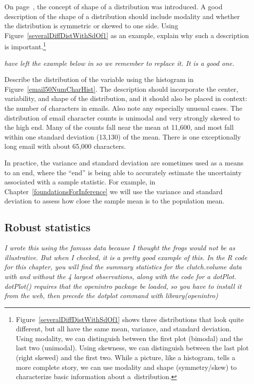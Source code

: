 \begin{doublespace}
\begin{exercise}
	On page~\pageref{shapeFirstDiscussed}, the concept of shape of a distribution was introduced. A good description of the shape of a distribution should include modality and whether the distribution is symmetric or skewed to one side. Using Figure~\ref{severalDiffDistWithSdOf1} as an example, explain why such a description is important.\footnote{Figure~\ref{severalDiffDistWithSdOf1} shows three distributions that look quite different, but all have the same mean, variance, and standard deviation. Using modality, we can distinguish between the first plot (bimodal) and the last two (unimodal). Using skewness, we can distinguish between the last plot (right skewed) and the first two. While a picture, like a histogram, tells a more complete story, we can use modality and shape (symmetry/skew) to characterize basic information about a~distribution.}
\end{exercise}

\textit{have left the example below in so we remember to replace it.  It is a good one.}

\begin{example}{Describe the distribution of the  variable using the histogram in Figure~\vref{email50NumCharHist}. The description should incorporate the center, variability, and shape of the distribution, and it should also be placed in context: the number of characters in emails. Also note any especially unusual cases.}
	The distribution of email character counts is unimodal and very strongly skewed to the high end. Many of the counts fall near the mean at 11,600, and most fall within one standard deviation (13,130) of the mean. There is one exceptionally long email with about 65,000 characters.
\end{example}

In practice, the variance and standard deviation are sometimes used as a means to an end, where the ``end'' is being able to accurately estimate the uncertainty associated with a sample statistic. For example, in Chapter~\ref{foundationsForInference} we will use the variance and standard deviation to assess how close the sample mean is to the population mean.


\subsection{Robust statistics}

\textit{I wrote this using the famuss data because I thought the frogs would not be as illustrative. But when I checked, it is a pretty good example of this.  In the R code for this chapter, you will find the summary statistics for the clutch.volume data with and without the 4 largest observations, along with the code for a dotPlot.  dotPlot() requires that the openintro package be loaded, so  you have to install it from the web, then precede the dotplot command with library(openintro)}


\end{doublespace}
